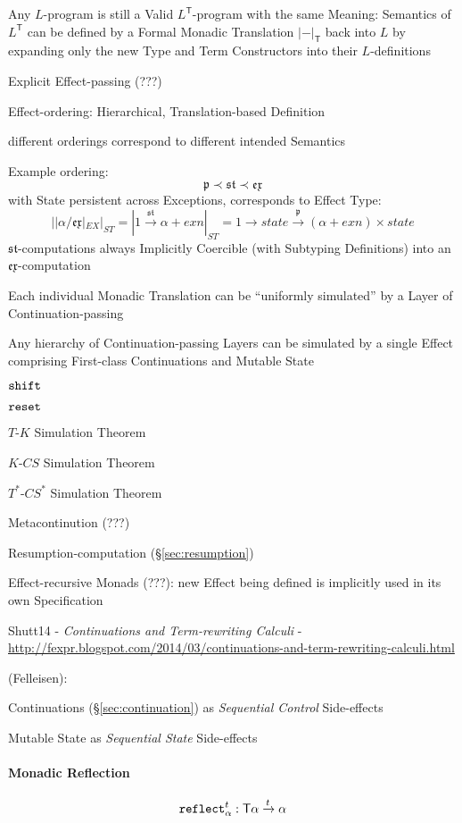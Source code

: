 Any $L$-program is still a Valid $L^\mathsf{T}$-program with the same
Meaning: Semantics of $L^\mathsf{T}$ can be defined by a Formal
Monadic Translation $|-|_\mathsf{T}$ back into $L$ by expanding only
the new Type and Term Constructors into their $L$-definitions

Explicit Effect-passing (???)

Effect-ordering: Hierarchical, Translation-based Definition

different orderings correspond to different intended Semantics

Example ordering:
\[
\mathfrak{p} \prec \mathfrak{st} \prec \mathfrak{ex}
\]
with State persistent across Exceptions, corresponds to Effect Type:
\[
  ||\alpha / \mathfrak{ex}|_{EX}|_{ST} = |1
  \xrightarrow{\mathfrak{st}} \alpha + exn|_{ST} = 1 \rightarrow state
  \xrightarrow{\mathfrak{p}} (\alpha + exn) \times state
\]
$\mathfrak{st}$-computations always Implicitly Coercible (with
Subtyping Definitions) into an
$\mathfrak{ex}$-computation

Each individual Monadic Translation can be ``uniformly simulated'' by
a Layer of Continuation-passing

Any hierarchy of Continuation-passing Layers can be simulated by a
single Effect comprising First-class Continuations and Mutable State

$\mathtt{shift}$

$\mathtt{reset}$

$T$-$K$ Simulation Theorem

$K$-$CS$ Simulation Theorem

$T^*$-$CS^*$ Simulation Theorem

Metacontinution (???)

Resumption-computation (\S\ref{sec:resumption})

Effect-recursive Monads (???): new Effect being defined is implicitly
used in its own Specification


\asterism

Shutt14 - \emph{Continuations and Term-rewriting Calculi} -
\url{http://fexpr.blogspot.com/2014/03/continuations-and-term-rewriting-calculi.html}

(Felleisen):

Continuations (\S\ref{sec:continuation}) as \emph{Sequential Control}
Side-effects

Mutable State as \emph{Sequential State} Side-effects



\paragraph{Monadic Reflection}\label{sec:monadic_reflection}\hfill
\[
  \mathtt{reflect}_\alpha^t : \mathsf{T} \alpha \xrightarrow{t} \alpha
\]

